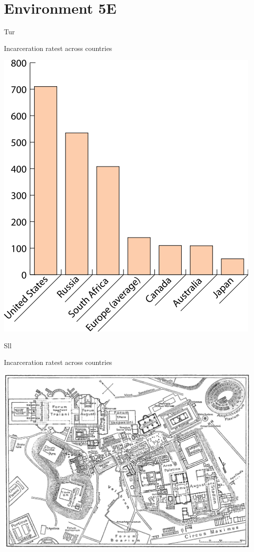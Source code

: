 \section{Environment 5E}

\begin{map}{T}{ur}
\caption{Incarceration ratest across countries}
\label{chart:incarceration}
\includegraphics[width=\chartwidth,height=\chartheight]{incarceration}  
\end{map}

\begin{map}{S}{ll}
\caption{Incarceration ratest across countries}
\label{chart:incarceration}
\includegraphics[width=\chartwidth,height=\chartheight]{Rome}  
\end{map}

